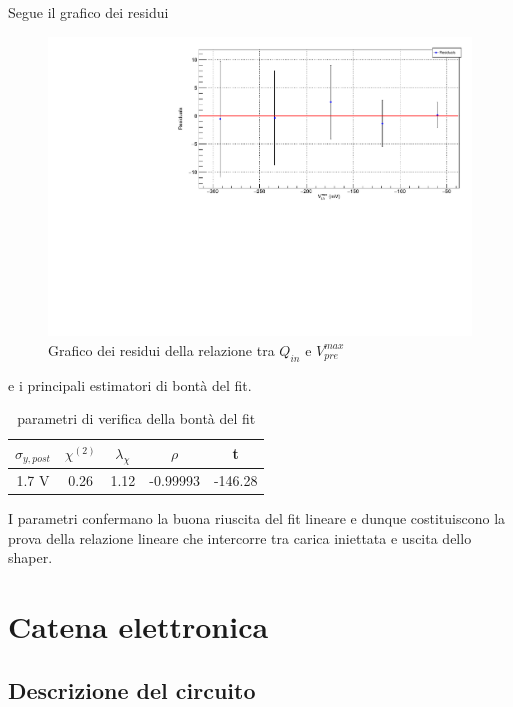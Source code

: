 \documentclass{article}
\begin{document}
Segue il grafico dei residui

\begin{center}
    \begin{figure}[H]
    \centering
    \includegraphics[scale=0.375, angle=0]{residuishaper.pdf}
    \caption{Grafico dei residui della relazione tra $Q_{in}$ e $V_{pre}^{max}$}
    \label{fig:residuishaper}
    \end{figure}
\end{center}

e i principali estimatori di bontà del fit.

\begin{table}[ht]
    \centering
    \begin{tabular}{ccccc}
        \toprule
        $\sigma_{y, post}$    &$\chi^{(2)}$    &$\lambda_{\chi}$   &$\rho$  &t   \\
        \midrule
        1.7 V               &0.26            &1.12              &-0.99993&-146.28\\
        \bottomrule
    \end{tabular}
    \caption{parametri di verifica della bontà del fit}
\end{table}

I parametri confermano la buona riuscita del fit lineare e dunque costituiscono la prova della relazione lineare che intercorre tra
carica iniettata e uscita dello shaper.


\section{Catena elettronica}

\subsection{Descrizione del circuito}
\end{document}
